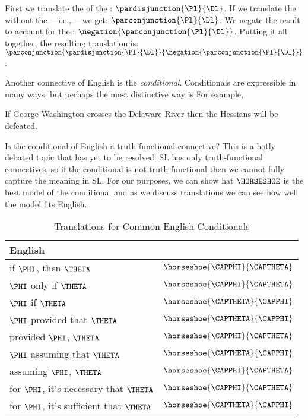 \noindent{}First we translate the  of the : $\pardisjunction{\Pl}{\Dl}$.  If we translate the  without the ---i.e., ---we get: $\parconjunction{\Pl}{\Dl}$.  We negate the result to account for the : $\negation{\parconjunction{\Pl}{\Dl}}$.  Putting it all together, the resulting translation is: $\parconjunction{\pardisjunction{\Pl}{\Dl}}{\negation{\parconjunction{\Pl}{\Dl}}}$.

Another connective of English is the \emph{conditional}.  Conditionals are expressible in many ways, but perhaps the most distinctive way is   For example,

\begin{menumerate}
	\item If George Washington crosses the Delaware River then the Hessians will be defeated.
\end{menumerate}

\noindent{}Is the conditional of English a truth-functional connective?  This is a hotly debated topic that has yet to be resolved.  SL has only truth-functional connectives, so if the conditional is not truth-functional then we cannot fully capture the meaning in SL.  For our purposes, we can show hat $\HORSESHOE$ is the best model of the conditional and as we discuss translations we can see how well the model fits English.

\begin{table}
	\renewcommand{\arraystretch}{1.5}%
	\begin{center}
		\begin{tabular}{ l l } %
			\toprule
			\textbf{English} & \textbf{\GSL{}} \\ 
			\midrule
			if $\PHI$, then $\THETA$ & $\horseshoe{\CAPPHI}{\CAPTHETA}$ \\
			$\PHI$ only if $\THETA$ & $\horseshoe{\CAPPHI}{\CAPTHETA}$ \\
			$\PHI$ if $\THETA$ & $\horseshoe{\CAPTHETA}{\CAPPHI}$ \\
			$\PHI$ provided that $\THETA$ & $\horseshoe{\CAPTHETA}{\CAPPHI}$ \\
			provided $\PHI$, $\THETA$ & $\horseshoe{\CAPPHI}{\CAPTHETA}$ \\
			$\PHI$ assuming that $\THETA$ & $\horseshoe{\CAPTHETA}{\CAPPHI}$ \\
			assuming $\PHI$, $\THETA$ & $\horseshoe{\CAPPHI}{\CAPTHETA}$ \\
			for $\PHI$, it's necessary that $\THETA$ & $\horseshoe{\CAPPHI}{\CAPTHETA}$ \\
			for $\PHI$, it's sufficient that $\THETA$ & $\horseshoe{\CAPTHETA}{\CAPPHI}$ \\
			\bottomrule
		\end{tabular}%
		\caption{Translations for Common English Conditionals}
		\label{TransTableA}
	\end{center}
\end{table}

